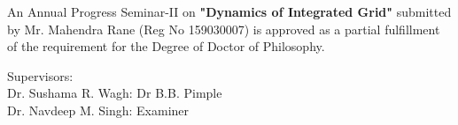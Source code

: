 \begin{spacing}{1.5}
\begin{approval}

An Annual Progress Seminar-II on  \textbf{"Dynamics of Integrated Grid"}  submitted by Mr. Mahendra Rane (Reg No 159030007) is approved as a partial fulfillment of the requirement for the Degree of Doctor of Philosophy. 

\vspace{4cm}

Supervisors:\\
Dr. Sushama R. Wagh: \hspace{4.5cm}  Dr B.B. Pimple \\ 
\vspace{1cm}
Dr. Navdeep M. Singh: \hspace{4.5cm} Examiner\\
						

\vspace{3cm}

\newpage

\end{approval}
\end{spacing}
























%
%
%
%						
%
%
%

